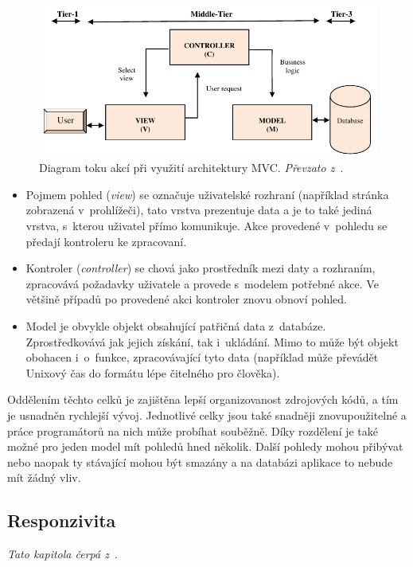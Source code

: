\begin{figure}[H]
	\centering
	\includegraphics[width=\textwidth]{obrazky-figures/mvc.pdf}
	\caption{Diagram toku akcí při využití architektury MVC. \emph{Převzato z~\cite{bib:mvc}}.}
	\label{img:mvc}
\end{figure}

\begin{itemize}
\item Pojmem pohled (\emph{view}) se označuje uživatelské rozhraní (například stránka zobrazená v~prohlížeči), tato vrstva prezentuje data a je to také jediná vrstva, s~kterou uživatel přímo komunikuje. Akce provedené v~pohledu se předají kontroleru ke zpracovaní.
\item Kontroler (\emph{controller}) se chová jako prostředník mezi daty a rozhraním, zpracovává požadavky uživatele a provede s~modelem potřebné akce. Ve většině případů po provedené akci kontroler znovu obnoví pohled.
\item Model je obvykle objekt obsahující patřičná data z~databáze. Zprostředkovává jak jejich získání, tak i~ukládání. Mimo to může být objekt obohacen i~o~funkce, zpracovávající tyto data (například může převádět Unixový čas do formátu lépe čitelného pro člověka). 
\end{itemize}


Oddělením těchto celků je zajištěna lepší organizovanost zdrojových kódů, a tím je usnadněn rychlejší vývoj. Jednotlivé celky jsou také snadněji znovupoužitelné a práce programátorů na nich může probíhat souběžně. Díky rozdělení je také možné pro jeden model mít pohledů hned několik. Další pohledy mohou přibývat nebo naopak ty stávající mohou být smazány a na databázi aplikace to nebude mít žádný vliv.


\subsection{Responzivita}\label{section:responsive}
\emph{Tato kapitola čerpá z~\cite{bib:responsive}}.

